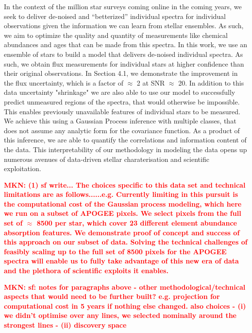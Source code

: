 \documentclass[a4paper,fleqn,usenatbib]{mnras}
\newcommand{\mkn}[1]{\textbf{\textcolor{red}{MKN: #1}}}
\begin{document}
 In the context of the million star surveys coming online in the coming years, we seek to deliver  de-noised and ``betterized'' individual spectra for individual observations given the information we can learn from stellar ensembles. As such, we aim to optimize the quality and quantity of measurements like chemical abundances and ages that can be made from this spectra. In this work, we use an ensemble of stars to build a model that delivers de-noised individual spectra. As such, we obtain flux measurements for individual stars at higher confidence than their original observations. In Section 4.1, we demonstrate the improvement in the flux uncertainty, which is a factor of $\approx$ 2 at SNR $\approx$ 20. In addition to this data uncertainty "shrinkage" we are  also able to use our model to successfully predict unmeasured regions of the spectra, that would otherwise be impossible. This enables previously unavailable features of individual stars to be measured. We achieve this using a Gaussian Process inference with multiple classes, that does not assume any analytic form for the covariance function. As a product of this inference, we are able to quantify the correlations and information content of the data. This interpretability of our methodology in modeling the data opens up numerous avenues of data-driven stellar charaterisation and scientific exploitation. 
 
 \mkn{ (1) sf write... The choices specific to this data set and technical limitations are as follows......e.g. Currently limiting in this pursuit is the computational cost of the Gaussian process modeling, which here we run on a subset of APOGEE pixels. We select pixels from the full set of $\approx$ 8500 per star, which  cover 23 different element abundance absorption features. We demonstrate proof of concept and success of this approach on our subset of data.  Solving the technical challenges of feasibly scaling up to the full set of 8500 pixels for the APOGEE spectra will enable us to fully take advantage of this new era of data and the plethora of scientific exploits it enables.  }
 
 \mkn{ sf: notes for paragraphs above - other  methodological/technical aspects that would need to be further built? e.g. projection for computational cost in 5 years if nothing else changed. also choices - (i) we didn't optimise over any lines, we selected nominally around the strongest lines - (ii) discovery space }

 

\end{document}
